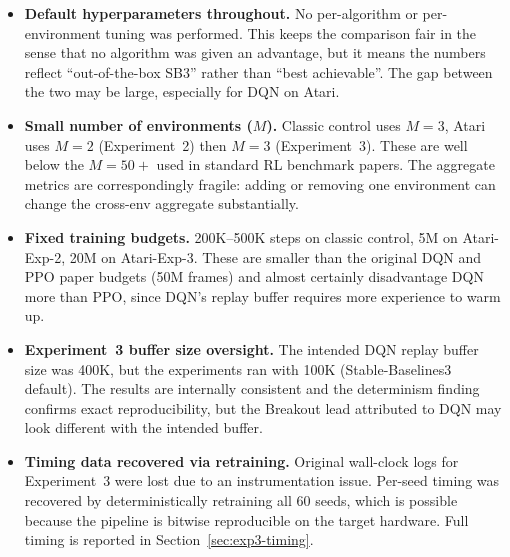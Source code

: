 \begin{itemize}
  \item \textbf{Default hyperparameters throughout.} No per-algorithm
  or per-environment tuning was performed. This keeps the comparison
  fair in the sense that no algorithm was given an advantage, but it
  means the numbers reflect ``out-of-the-box SB3'' rather than ``best
  achievable''. The gap between the two may be large, especially for
  DQN on Atari.
  \item \textbf{Small number of environments ($M$).} Classic control
  uses $M=3$, Atari uses $M=2$ (Experiment~2) then $M=3$
  (Experiment~3). These are well below the $M=50+$ used in standard RL
  benchmark papers. The aggregate metrics are correspondingly fragile:
  adding or removing one environment can change the cross-env aggregate
  substantially.
  \item \textbf{Fixed training budgets.} 200K--500K steps on classic
  control, 5M on Atari-Exp-2, 20M on Atari-Exp-3. These are smaller
  than the original DQN and PPO paper budgets (50M frames) and almost
  certainly disadvantage DQN more than PPO, since DQN's replay buffer
  requires more experience to warm up.
  \item \textbf{Experiment~3 buffer size oversight.} The intended DQN
  replay buffer size was 400K, but the experiments ran with 100K
  (Stable-Baselines3 default). The results are internally consistent
  and the determinism finding confirms exact reproducibility, but the
  Breakout lead attributed to DQN may look different with the intended
  buffer.
  \item \textbf{Timing data recovered via retraining.}
  Original wall-clock logs for Experiment~3 were lost due to an instrumentation issue. Per-seed timing was recovered by deterministically retraining all 60 seeds, which is possible because the pipeline is bitwise reproducible on the target hardware. Full timing is reported in Section~\ref{sec:exp3-timing}.
\end{itemize}


